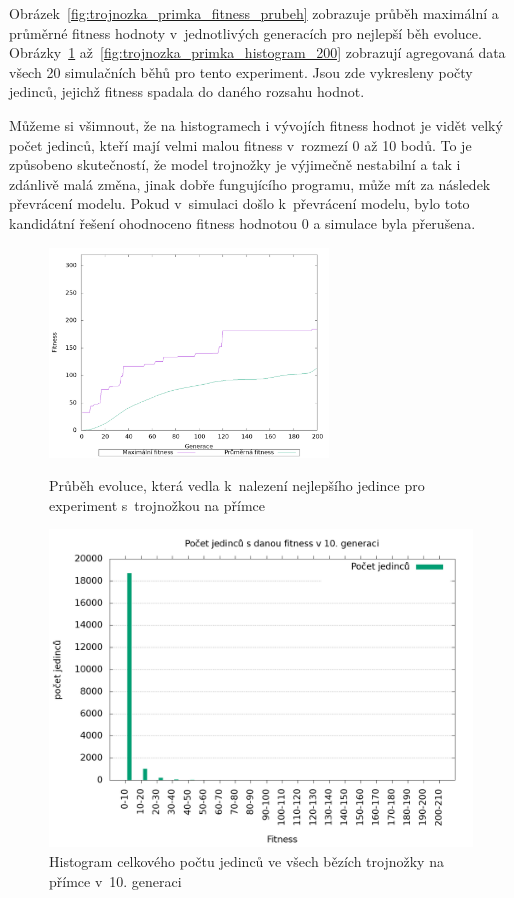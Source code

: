 Obrázek~\ref{fig:trojnozka_primka_fitness_prubeh} zobrazuje průběh maximální a průměrné fitness hodnoty v~jednotlivých generacích pro nejlepší běh evoluce.
Obrázky~\ref{fig:trojnozka_primka_histogram_10} až~\ref{fig:trojnozka_primka_histogram_200} zobrazují agregovaná data všech 20 simulačních běhů pro tento experiment.
Jsou zde vykresleny počty jedinců, jejichž fitness spadala do daného rozsahu hodnot.

Můžeme si všimnout, že na histogramech i vývojích fitness hodnot je vidět velký počet jedinců, kteří mají velmi malou fitness v~rozmezí 0 až 10 bodů.
To je způsobeno skutečností, že model trojnožky je výjimečně nestabilní a tak i zdánlivě malá změna, jinak dobře fungujícího programu, může mít za následek převrácení modelu.
Pokud v~simulaci došlo k~převrácení modelu, bylo toto kandidátní řešení ohodnoceno fitness hodnotou 0 a simulace byla přerušena.


\begin{figure}[h]
    \begin{minipage}[c]{0.48\linewidth}
    {\includegraphics[width=20em]{obrazky/trojnozka_primka_fitness_prubeh.png}}
        \caption{
            Průběh evoluce, která vedla k~nalezení nejlepšího jedince pro experiment s~trojnožkou na přímce
        }
        \label{fig:trojnozka_primka_fitness_prubeh}
    \end{minipage}
    \hfill
    \begin{minipage}[c]{0.48\linewidth}
        \includegraphics[width=\linewidth]{obrazky/trojnozka_primka_fitnessHistogram10.png}
        \caption{Histogram celkového počtu jedinců ve všech bězích trojnožky na přímce v~10. generaci}
        \label{fig:trojnozka_primka_histogram_10}
    \end{minipage}
\end{figure}

